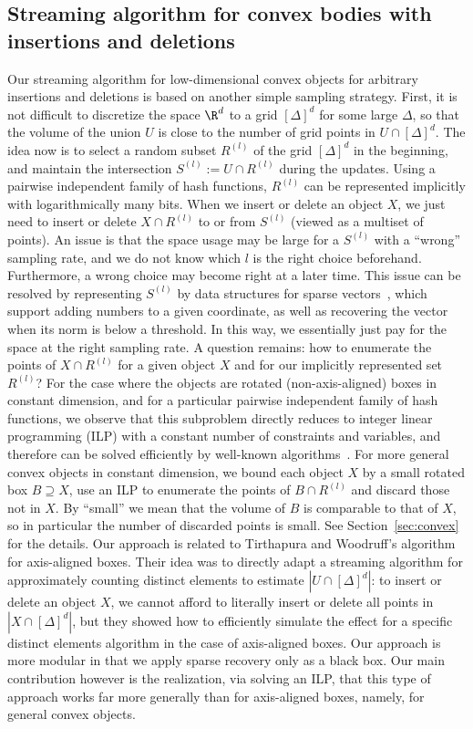 \subsection{Streaming algorithm for convex bodies with insertions and deletions}
Our streaming algorithm for low-dimensional convex objects for arbitrary insertions and deletions is based on another simple sampling strategy. First, it is not difficult to discretize the space $\R^d$ to a grid $[\Delta]^d$ for some large $\Delta$, so that the volume of the union $U$ is close to the number of grid points in $U \cap [\Delta]^d$. The idea now is to select a random subset $R^{(l)}$ of the grid $[\Delta]^d$ in the beginning, and maintain the intersection $S^{(l)} := U \cap R^{(l)}$ during the updates. Using a pairwise independent family of hash functions, $R^{(l)}$ can be represented implicitly with logarithmically many bits.
%
When we insert or delete an object $X$, we just need to insert or delete $X \cap R^{(l)}$ to or from $S^{(l)}$ (viewed as a multiset of points).
An issue is that the space usage may be large for a $S^{(l)}$ with a ``wrong'' sampling rate, and we do not know which $l$ is the right choice beforehand. Furthermore, a wrong choice may become right at a later time.
This issue can be resolved by representing $S^{(l)}$ by data structures for sparse vectors~\cite{FrahlingIS08,JowhariST11}, which support adding numbers to a given coordinate, as well as recovering the vector when its norm is below a threshold. In this way, we essentially just pay for the space at the right sampling rate.
%
A question remains: how to enumerate the points of $X \cap R^{(l)}$ for a given object $X$ and for our implicitly represented set $R^{(l)}$? For the case where the objects are rotated (non-axis-aligned) boxes in constant dimension, and for a particular pairwise independent family of hash functions, we observe that this subproblem directly reduces to integer linear programming (ILP) with a constant number of constraints and variables, and therefore can be solved efficiently by well-known algorithms~\cite{Lenstra83}.
For more general convex objects in constant dimension, we bound each object $X$ by a small rotated box $B \supseteq X$, use an ILP to enumerate the points of $B \cap R^{(l)}$ and discard those not in $X$. By ``small'' we mean that the volume of $B$ is comparable to that of $X$, so in particular the number of discarded points is small. See Section~\ref{sec:convex} for the details.
%
Our approach is related to Tirthapura and Woodruff's algorithm~\cite{TW12} for axis-aligned boxes. Their idea was to directly adapt a streaming algorithm for approximately counting distinct elements to estimate $|U\cap [\Delta]^d|$: 
to insert or delete an object $X$, we cannot afford to literally insert or delete all points in $|X\cap [\Delta]^d|$, but they showed how to efficiently simulate the effect for a specific distinct elements algorithm in the case of axis-aligned boxes.
Our approach is more modular in that we apply sparse recovery only as a black box.
Our main contribution however is the realization, via solving an ILP, that this type of approach works far more generally than for axis-aligned boxes, namely, for general convex objects.
%
